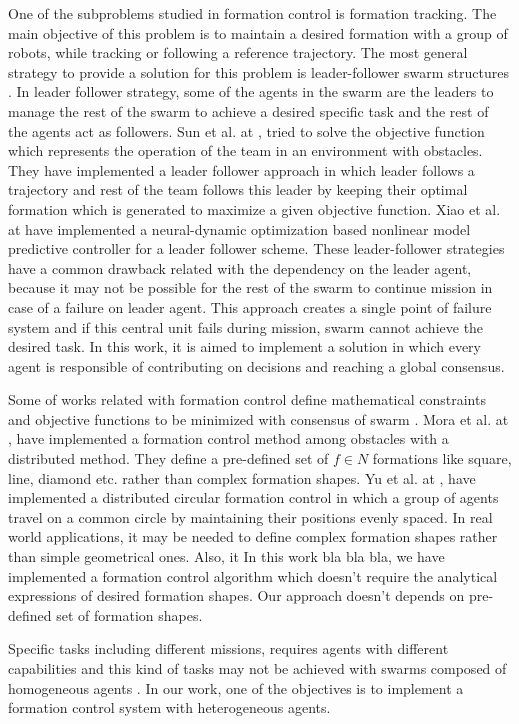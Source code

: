 \documentclass[letterpaper, 10 pt, conference]{ieeeconf}  %
\begin{document}
One of the subproblems studied in formation control is formation tracking. The main objective of this problem is to maintain a desired formation with a group of robots, while tracking or following a reference trajectory. The most general strategy to provide a solution for this problem is leader-follower swarm structures \cite{502,503}. In leader follower strategy, some of the agents in the swarm are the leaders to manage the rest of the swarm to achieve a desired specific task and the rest of the agents act as followers. Sun et al. at \cite{502}, tried to solve the objective function which represents the operation of the team in an environment with obstacles. They have implemented a leader follower approach in which leader follows a trajectory and rest of the team follows this leader by keeping their optimal formation which is generated to maximize a given objective function. Xiao et al. at \cite{503} have implemented a neural-dynamic optimization based nonlinear model predictive controller for a leader follower scheme. These leader-follower strategies have a common drawback related with the dependency on the leader agent, because it may not be possible for the rest of the swarm to continue mission in case of a failure on leader agent. This approach creates a single point of failure system and if this central unit fails during mission, swarm cannot achieve the desired task. In this work, it is aimed to implement a solution in which every agent is responsible of contributing on decisions and reaching a global consensus. 




Some of works related with formation control define mathematical constraints and objective functions to be minimized with consensus of swarm \cite{501,506}. Mora et al. at \cite{501}, have implemented a formation control method among obstacles with a distributed method. They define a pre-defined set of $f \in N$ formations like square, line, diamond etc. rather than complex formation shapes. Yu et al. at \cite{506}, have implemented a distributed circular formation control in which a group of agents travel on a common circle by maintaining their positions evenly spaced. In real world applications, it may be needed to define complex formation shapes rather than simple geometrical ones. Also, it  In this work bla bla bla, we have implemented a formation control algorithm which doesn't require the analytical expressions of desired formation shapes. Our approach doesn't depends on pre-defined set of formation shapes.

Specific tasks including different missions, requires agents with different capabilities and this kind of tasks may not be achieved with swarms composed of homogeneous agents \cite{99}. In our work, one of the objectives is to implement a formation control system with heterogeneous agents. 
\end{document}
